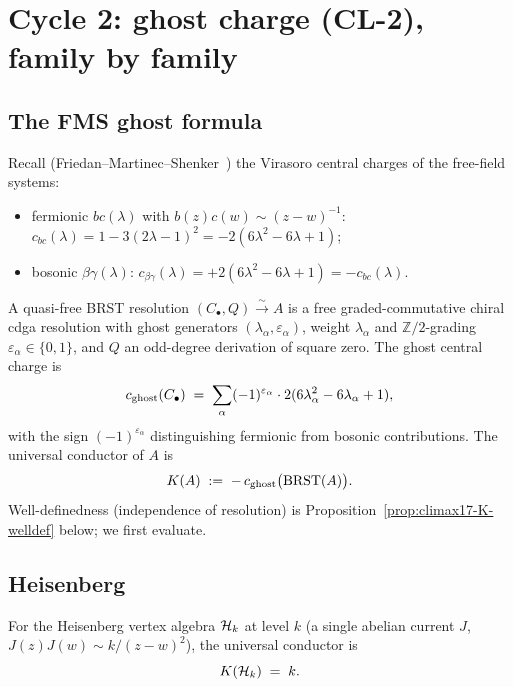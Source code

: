 \section{Cycle 2: ghost charge (CL-2), family by family}
\label{sec:climax17-cycle2}

\subsection{The FMS ghost formula}

Recall (Friedan--Martinec--Shenker~\cite{FMS86}) the Virasoro central
charges of the free-field systems:
\begin{itemize}
\item fermionic $bc(\lambda)$ with $b(z)c(w)\sim(z-w)^{-1}$:
      $c_{bc}(\lambda)=1-3(2\lambda-1)^2=-2(6\lambda^2-6\lambda+1)$;
\item bosonic $\beta\gamma(\lambda)$:
      $c_{\beta\gamma}(\lambda)=+2(6\lambda^2-6\lambda+1)=-c_{bc}(\lambda)$.
\end{itemize}
A quasi-free BRST resolution $(C_\bullet,Q)\xrightarrow{\sim}A$ is a
free graded-commutative chiral cdga resolution with ghost generators
$(\lambda_\alpha,\varepsilon_\alpha)$, weight $\lambda_\alpha$ and
$\mathbb{Z}/2$-grading $\varepsilon_\alpha\in\{0,1\}$, and $Q$ an
odd-degree derivation of square zero. The ghost central charge is
\begin{equation}
\label{eq:climax17-cghost-formula}
  c_{\mathrm{ghost}}(C_\bullet)
  \;=\;\sum_{\alpha}(-1)^{\varepsilon_\alpha}\cdot
       2(6\lambda_\alpha^2-6\lambda_\alpha+1),
\end{equation}
with the sign $(-1)^{\varepsilon_\alpha}$ distinguishing fermionic from
bosonic contributions. The universal conductor of $A$ is
\begin{equation}
\label{eq:climax17-K-definition}
  K(A)\;:=\;-\,c_{\mathrm{ghost}}\bigl(\mathrm{BRST}(A)\bigr).
\end{equation}
Well-definedness (independence of resolution) is
Proposition~\ref{prop:climax17-K-welldef} below; we first evaluate.

\subsection{Heisenberg}
\label{subsec:climax17-heisenberg}

\begin{proposition}[$K(\Heis_k)=k$]
\label{prop:climax17-K-heisenberg}
\ClaimStatusProvedHere
For the Heisenberg vertex algebra $\mathcal{H}_k$ at level $k$ (a single
abelian current $J$, $J(z)J(w)\sim k/(z-w)^2$), the universal conductor
is
\[
  K(\mathcal{H}_k)\;=\;k.
\]
\end{proposition}

